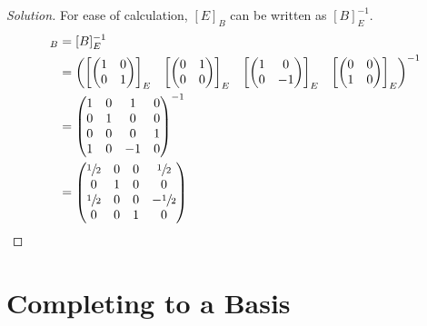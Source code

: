 \documentclass[fleqn, a4paper, 12pt]{article}
\theoremstyle{definition}
\theoremstyle{theorem}
\newenvironment{solution}
{\begin{proof}[Solution]\let\qed\relax}
	{\end{proof}}
\begin{document}
\begin{solution}
	For ease of calculation, $[E]_B$ can be written as $[B]_E^{-1}$.
	\begin{align*}
		[E]_B &= [B]_E^{-1}\\
		&= 
		\begin{pmatrix}
			\left[
				\begin{pmatrix}
					1 & 0\\
					0 & 1\\
				\end{pmatrix}
			\right]_E
			&
			\left[
				\begin{pmatrix}
					0 & 1\\
					0 & 0\\
				\end{pmatrix}
			\right]_E
			&
			\left[
				\begin{pmatrix}
					1 & 0\\
					0 & -1\\
				\end{pmatrix}
			\right]_E
			&
			\left[
				\begin{pmatrix}
					0 & 0\\
					1 & 0\\
				\end{pmatrix}
			\right]_E
			\\
		\end{pmatrix}^{-1}\\
		&=
		\begin{pmatrix}
			1 & 0 & 1 & 0\\
			0 & 1 & 0 & 0\\
			0 & 0 & 0 & 1\\
			1 & 0 & -1 & 0\\
		\end{pmatrix}^{-1}\\
		&= 
		\begin{pmatrix}
			\sfrac{1}{2} & 0 & 0 & \sfrac{1}{2}\\
			0 & 1 & 0 & 0\\
			\sfrac{1}{2} & 0 & 0 & - \sfrac{1}{2}\\
			0 & 0 & 1 & 0\\
		\end{pmatrix}
	\end{align*}
\end{solution}

\section{Completing to a Basis}
\end{document}
